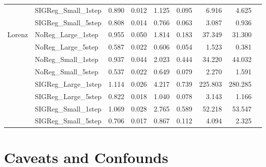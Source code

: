 \documentclass{article}
\begin{document}
\begin{table}[h]
\begin{tabular}{llrrrrrrr}
 & SIGReg\_Small\_1step & 0.890 & 0.012 & 1.125 & 0.095 & 6.916   & 4.625 \\
 & SIGReg\_Small\_5step & 0.808 & 0.014 & 0.766 & 0.063 & 3.087   & 0.936 \\
\midrule
\multirow{8}{*}{Lorenz}
 & NoReg\_Large\_1step  & 0.955 & 0.050 & 1.814 & 0.183 & 37.349  & 31.300 \\
 & NoReg\_Large\_5step  & 0.587 & 0.022 & 0.606 & 0.054 & 1.523   & 0.381 \\
 & NoReg\_Small\_1step  & 0.937 & 0.044 & 2.023 & 0.444 & 34.220  & 44.032 \\
 & NoReg\_Small\_5step  & 0.537 & 0.022 & 0.649 & 0.079 & 2.270   & 1.591 \\
 & SIGReg\_Large\_1step & 1.114 & 0.026 & 4.217 & 0.739 & 225.803 & 280.285 \\
 & SIGReg\_Large\_5step & 0.822 & 0.018 & 1.040 & 0.078 & 3.143   & 1.166 \\
 & SIGReg\_Small\_1step & 1.069 & 0.028 & 2.765 & 0.589 & 52.218  & 53.547 \\
 & SIGReg\_Small\_5step & 0.706 & 0.017 & 0.867 & 0.112 & 4.094   & 2.325 \\
\bottomrule
\end{tabular}
\end{table}

\section{Caveats and Confounds}
\label{app:caveats}
\end{document}
